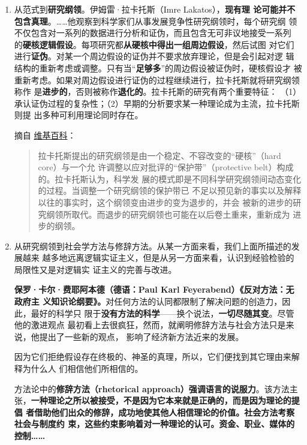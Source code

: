 \begin{enumerate}
\item 从范式到\textbf{研究纲领}。伊姆雷·拉卡托斯（Imre Lakatos），\textbf{现有理
    论可能并不包含真理}。……他观察到科学家们从事发展竞争性研究纲领时，每个研究纲
  领不仅包含对一系列的数据进行分析和证伪，而且包含无可非议地接受一系列
  的\textbf{硬核逻辑假设}。每项研究都\textbf{从硬核中得出一组周边假设}，然后试图
  对它们进行\textbf{证伪}。对某一个周边假设的证伪并不要求放弃理论，但是会引起对逻
  辑结构的重新考虑或调整。只有当“\textbf{足够多}”的周边假设被证伪时，硬核假设才
  被重新考虑。如果对周边假设进行证伪的过程继续进行，拉卡托斯就将研究纲领称作
  是\textbf{进步的}，否则被称作\textbf{退化的}。拉卡托斯的研究有两个重要特征：
  （1）承认证伪过程的复杂性；（2）早期的分析要求某一种理论成为主流，拉卡托斯则提
  出多种可利用理论同时存在。

  摘自 \href{https://zh.wikipedia.org/wiki/%E7%A0%94%E7%A9%B6%E7%BA%B2%E9%A2%86}{维基百科}：
    \begin{quotation}
      拉卡托斯提出的研究纲领是由一个稳定、不容改变的“硬核”（hard core）与一个允
      许调整以应对批评的“保护带”（protective belt）构成的。拉卡托斯认为，科学发
      展的模式即是不同科学研究纲领间动态变化的过程。当调整一个研究纲领的保护带已
      不足以预见新的事实以及解释以往的事实时，这个纲领变由进步的变为退步的，并会
      被新的进步的研究纲领所取代。而退步的研究纲领也可能在以后卷土重来，重新成为
      进步的纲领。
    \end{quotation}

\item 从研究纲领到社会学方法与修辞方法。从某一方面来看，我们上面所描述的发展越来
  越多地远离逻辑实证主义，但是从另一方面来看，认识到经验检验的局限性又是对逻辑实
  证主义的完善与改进。

  \textbf{保罗·卡尔·费耶阿本德（德语：Paul Karl Feyerabend）《反对方法：无政府主
    义知识论纲要》。}对任何方法的认同都限制了解决问题的创造力，因此，最好的科学只
  限于\textbf{没有方法的科学}——换个说法，\textbf{一切尽随其变}。尽管他的激进观点
  最初看上去很疯狂，然而，就阐明修辞方法与社会方法只是来说，他提出了一些新的观点，
  影响了经济新方法近来的发展。

  因为它们拒绝假设存在终极的、神圣的真理，所以，它们便找到其它理由来解释为什么人
  们相信他们所相信的。

  方法论中的\textbf{修辞方法（rhetorical approach）强调语言的说服力}。该方法主
  张，\textbf{一种理论之所以被接受，不是因为它本来就是正确的，而是因为理论的提倡
    者借助他们出众的修辞，成功地使其他人相信理论的价值。社会方法考察社会与制度约
    束，这些约束影响着对一种理论的认可。资金、职业、媒体的控制……}


\end{enumerate}

